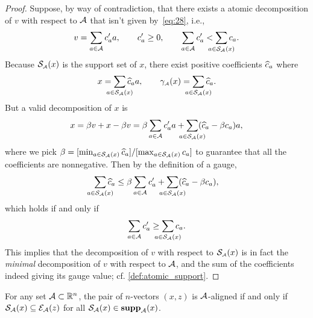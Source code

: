 \begin{proof}
  Suppose, by way of contradiction, that there exists a atomic decomposition of
  $v$ with respect to $\mathcal{A}$ that isn't given by~\eqref{eq:28}, i.e.,
  \[
    v = \sum_{a\in \Ascr} c'_a a,\qquad c_a' \geq 0, \qquad
    \sum_{a\in\Ascr} c'_a < \sum_{\mathclap{a\in\Sscr\As(x)}}c_a.
  \] 
  Because $\operatorname{\mathcal{S}_{\scriptscriptstyle\mathcal{A}}}(x)$ is the support set of
  $x$, there exist positive coefficients $\chat_a$ where
  \[
          x = \sum_{\mathclap{a\in\suppa(x)}} \chat_a a,
          \qquad
          \gauge\As(x) = \sum_{\mathclap{a\in \suppa(x)}} \chat_a.
  \]
  But a valid decomposition of $x$ is 
  \[
          x = \beta v + x - \beta v = \beta \sum_{a\in \Ascr} c'_a a +
          \sum_{\mathclap{a\in \suppa(x)}} (\chat_a - \beta c_a) a,
  \]
  where we pick
        $\beta = [\min_{a\in \suppa(x)} \chat_a]/[\max_{a\in
          \suppa(x)} c_a]$ to guarantee that all the coefficients are
        nonnegative. 
         Then by the definition of a gauge, 
  \[
          \sum_{\mathclap{a\in \suppa(x)}} \chat_a \leq \beta \sum_{a\in\Ascr}
          c'_a + \sum_{\mathclap{a\in \suppa(x)}} (\chat_a - \beta c_a),
  \]
  which holds if and only if
  \[
          \sum_{a\in\Ascr} c'_a \geq \sum_{\mathclap{a\in\suppa(x)}} c_a.
  \]
  This implies that the decomposition of $v$ with respect to
  $\operatorname{\mathcal{S}_{\scriptscriptstyle\mathcal{A}}}(x)$ is in fact the \emph{minimal} decomposition of $v$ with respect
  to $\mathcal{A}$, and the sum of the coefficients indeed giving its gauge
  value; cf. \autoref{def:atomic_support}.
\end{proof}

\begin{proposition} \label{prop:support-identification}
  For any set $\mathcal{A}\subset\mathbb{R}^n$, the pair of $n$-vectors $(x,z)$ is
  $\mathcal{A}$-aligned if and only if $\mathcal{S}_{\mathcal{A}}(x) \subseteq \mathcal{E}_{\mathcal{A}}(z)$ for
  all $\mathcal{S}_{\mathcal{A}}(x)\in \operatorname{\hbox{\rm\textbf{supp}}}_{\mathcal{A}}(x)$.
\end{proposition}

